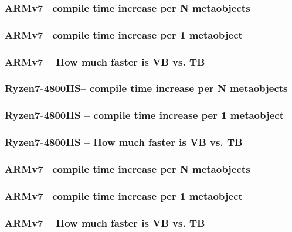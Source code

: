 \documentclass[compress,table,xcolor=table]{beamer}
\begin{document}
\begin{frame}
  \frametitle{ARMv7-- compile time increase per N metaobjects}
\end{frame}
\begin{frame}
  \frametitle{ARMv7-- compile time increase per 1 metaobject}
\end{frame}
\begin{frame}
  \frametitle{ARMv7 -- How much faster is VB vs. TB}
\end{frame}
\begin{frame}
  \frametitle{Ryzen7-4800HS-- compile time increase per N metaobjects}
\end{frame}
\begin{frame}
  \frametitle{Ryzen7-4800HS -- compile time increase per 1 metaobject}
\end{frame}
\begin{frame}
  \frametitle{Ryzen7-4800HS -- How much faster is VB vs. TB}
\end{frame}
\begin{frame}
  \frametitle{ARMv7-- compile time increase per N metaobjects}
\end{frame}
\begin{frame}
  \frametitle{ARMv7-- compile time increase per 1 metaobject}
\end{frame}
\begin{frame}
  \frametitle{ARMv7 -- How much faster is VB vs. TB}
\end{frame}
\end{document}
